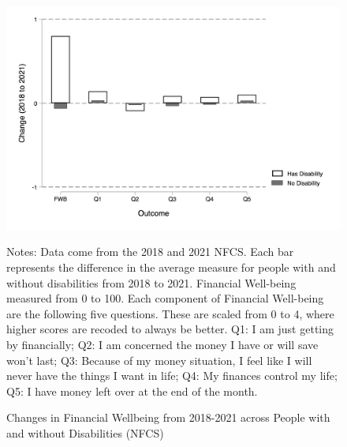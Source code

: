 \documentclass[12pt]{article}
\begin{document}
\begin{figure}[h!]\label{NFCS_FWB}
\caption{Changes in Financial Wellbeing from 2018-2021 across People with and without Disabilities (NFCS) }
\centering
\includegraphics[scale=0.4]{Exhibits/ChangeFWB_18_21_NFCSdisabilitynodis.png}
\medskip 
\begin{minipage}{0.65\textwidth} 
{\footnotesize Notes: Data come from the 2018 and 2021 NFCS. Each bar represents the difference in the average measure for people with and without disabilities from 2018 to 2021. Financial Well-being measured from 0 to 100. Each component of Financial Well-being are the following five questions. These are scaled from 0 to 4, where higher scores are recoded to always be better. Q1: I am just getting by financially; Q2: I am concerned the money I have or will save won't last; Q3: Because of my money situation, I feel like I will never have the things I want in life; Q4: My finances control my life; Q5: I have money left over at the end of the month. \par}
\end{minipage}
\end{figure}
\clearpage
\end{document}
